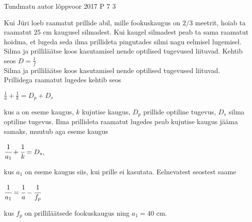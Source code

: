 {Tundmatu autor} %
{lõppvoor} %
{2017} %
{P 7} %
{3} %
{
\ifStatement
Kui Jüri loeb raamatut prillide abil, mille fookuskaugus on $2/3$ meetrit, hoiab ta raamatut $25$ cm kaugusel silmadest. Kui kaugel silmadest peab ta sama raamatut hoidma, et lugeda seda ilma prillideta pingutades silmi nagu eelmisel lugemisel.
\fi
\ifHint
Silma ja prilliläätse koos kasutamisel nende optilised tugevused liituvad.
\fi
\ifSolution
Kehtib seos $D = \frac{1}{f}$ \\
Silma ja prilliläätse koos kasutamisel nende optilised tugevused liituvad. Prillidega raamatut lugedes kehtib seos 
\begin{center}
$\frac{1}{a} + \frac{1}{k} = D_p + D_s$ 
\end{center}
kus a on eseme kaugus, $k$ kujutise kaugus, $D_p$ prillide optiline tugevus, $D_s$ silma optiline tugevus. Ilma prillideta raamatut lugedes peab kujutise kaugus jääma samaks, muutub aga eseme kaugus 
\begin{center}
$\cfrac {1}{a_1} + \cfrac{1}{k} = D_s$, 
\end{center}
kus $a_1$ on eseme kaugus siis, kui prille ei kasutata. Eelnevatest seostest saame
\begin{center}
$\cfrac {1}{a_1} = \cfrac{1}{a} - \cfrac{1}{f_p}$
\end{center}
kus $f_p$ on prilliläätsede fookuskaugus ning $a_1 = 40$ cm.
\fi
}
